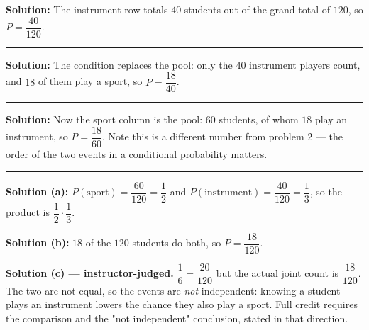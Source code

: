 \documentclass[12pt]{article}
\begin{document}




\textbf{Solution:} \quad The instrument row totals $40$ students out of the grand total of
$120$, so $P = \dfrac{40}{120}$. 

\vspace{0.15cm}\noindent\rule{\linewidth}{0.2pt}\vspace{0.15cm}


\textbf{Solution:} \quad The condition replaces the pool: only the $40$ instrument players
count, and $18$ of them play a sport, so $P = \dfrac{18}{40}$. 

\vspace{0.15cm}\noindent\rule{\linewidth}{0.2pt}\vspace{0.15cm}


\textbf{Solution:} \quad Now the sport column is the pool: $60$ students, of whom $18$ play an
instrument, so $P = \dfrac{18}{60}$. Note this is a different number from problem 2 --- the
order of the two events in a conditional probability matters. 

\vspace{0.15cm}\noindent\rule{\linewidth}{0.2pt}\vspace{0.15cm}


\textbf{Solution (a):} \quad $P(\text{sport}) = \dfrac{60}{120} = \dfrac{1}{2}$ and
$P(\text{instrument}) = \dfrac{40}{120} = \dfrac{1}{3}$, so the product is
$\dfrac{1}{2} \cdot \dfrac{1}{3}$. 

\textbf{Solution (b):} \quad $18$ of the $120$ students do both, so
$P = \dfrac{18}{120}$. 

\textbf{Solution (c) --- instructor-judged.} \quad $\dfrac{1}{6} = \dfrac{20}{120}$ but the
actual joint count is $\dfrac{18}{120}$. The two are not equal, so the events are \emph{not}
independent: knowing a student plays an instrument lowers the chance they also play a sport.
Full credit requires the comparison and the "not independent" conclusion, stated in that
direction.
\end{document}
